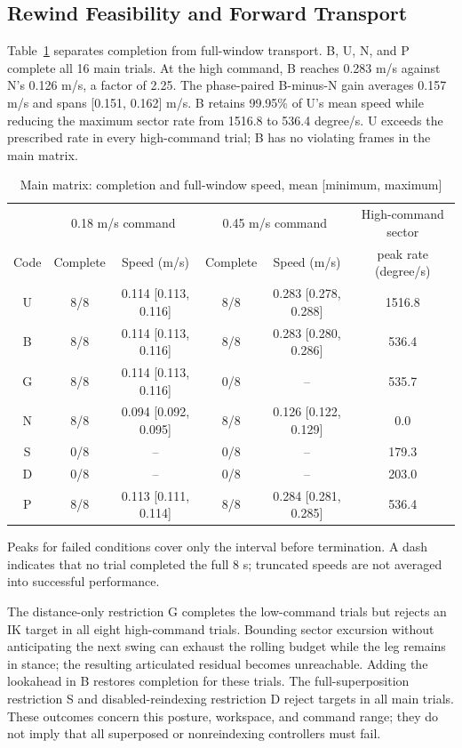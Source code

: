 \subsection{Rewind Feasibility and Forward Transport}
Table~\ref{tab:main} separates completion from full-window transport. B, U, N, and P complete all 16 main trials. At the high command, B reaches 0.283 m/s against N's 0.126 m/s, a factor of 2.25. The phase-paired B-minus-N gain averages 0.157 m/s and spans [0.151, 0.162] m/s. B retains 99.95\% of U's mean speed while reducing the maximum sector rate from 1516.8 to 536.4 degree/s. U exceeds the prescribed rate in every high-command trial; B has no violating frames in the main matrix.

\begin{table}[t]\centering\small
\caption{Main matrix: completion and full-window speed, mean [minimum, maximum]}
\label{tab:main}
\begin{tabular}{cccccc}\toprule
 & \multicolumn{2}{c}{0.18 m/s command} & \multicolumn{2}{c}{0.45 m/s command} & High-command sector\\
Code & Complete & Speed (m/s) & Complete & Speed (m/s) & peak rate (degree/s)\\\midrule
U & 8/8 & 0.114 [0.113, 0.116] & 8/8 & 0.283 [0.278, 0.288] & 1516.8\\
B & 8/8 & 0.114 [0.113, 0.116] & 8/8 & 0.283 [0.280, 0.286] & 536.4\\
G & 8/8 & 0.114 [0.113, 0.116] & 0/8 & -- & 535.7\\
N & 8/8 & 0.094 [0.092, 0.095] & 8/8 & 0.126 [0.122, 0.129] & 0.0\\
S & 0/8 & -- & 0/8 & -- & 179.3\\
D & 0/8 & -- & 0/8 & -- & 203.0\\
P & 8/8 & 0.113 [0.111, 0.114] & 8/8 & 0.284 [0.281, 0.285] & 536.4\\
\bottomrule\end{tabular}
\par\vspace{5pt}\noindent\parbox{.96\textwidth}{\footnotesize Peaks for failed conditions cover only the interval before termination. A dash indicates that no trial completed the full 8 s; truncated speeds are not averaged into successful performance.}
\end{table}

The distance-only restriction G completes the low-command trials but rejects an IK target in all eight high-command trials. Bounding sector excursion without anticipating the next swing can exhaust the rolling budget while the leg remains in stance; the resulting articulated residual becomes unreachable. Adding the lookahead in B restores completion for these trials. The full-superposition restriction S and disabled-reindexing restriction D reject targets in all main trials. These outcomes concern this posture, workspace, and command range; they do not imply that all superposed or nonreindexing controllers must fail.


